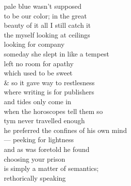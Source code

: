 pale blue wasn't supposed\\
to be our color; in the great\\
beauty of it all I still catch it\\
the myself looking at ceilings\\
looking for company\\

someday she slept  in like a tempest\\
left no room for apathy\\
which used to be sweet\\
\& so it gave way to restlesness\\
where writing is for publishers\\
and tides only come in\\
when the horoscopes tell them so\\

tym never travelled enough\\
he preferred the confines of his own mind\\
--- peeking for lightness\\
and as was foretold he found\\
choosing your prison\\
is simply a matter of semantics; \\
rethorically speaking
